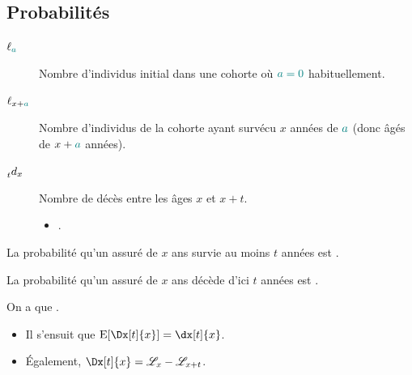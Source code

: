 \documentclass[french]{article}
\begin{document}
\begin{multicols*}{2}
\subsection{Probabilités}
\begin{distributions}[Notation]
\begin{description}
	\item[$\ell_{\textcolor{teal}{a}}$]	Nombre d'individus initial dans une cohorte où $\textcolor{teal}{a = 0}$ habituellement.
	\item[$\ell_{x + \textcolor{teal}{a}}$]	Nombre d'individus de la cohorte ayant survécu $x$ années de $\textcolor{teal}{a}$ (donc âgés de $x + \textcolor{teal}{a}$ années).
	\item[$\prescript{}{t}d_{x}$]	Nombre de décès entre les âges $x$ et $x + t$.
		\begin{itemize}
		\item	{}.
		\end{itemize}
\end{description}
\end{distributions}

\begin{definitionNOHFILLsub}
La probabilité qu'un assuré de $x$ ans survie au moins $t$ années est .
\end{definitionNOHFILLsub}

\begin{definitionNOHFILLsub}
La probabilité qu'un assuré de $x$ ans décède d'ici $t$ années est .
\end{definitionNOHFILLsub}


\begin{definitionNOHFILL}
On a que .

\begin{itemize}
	\item	Il s'ensuit que $\text{E}[\Dx[t]{x}] = \dx[t]{x}$.
	\item	Également, $\Dx[t]{x} = \mathscr{L}_{x} - \mathscr{L}_{x + t}$.
\end{itemize}
\end{definitionNOHFILL}


\columnbreak

\end{multicols*}
\end{document}
